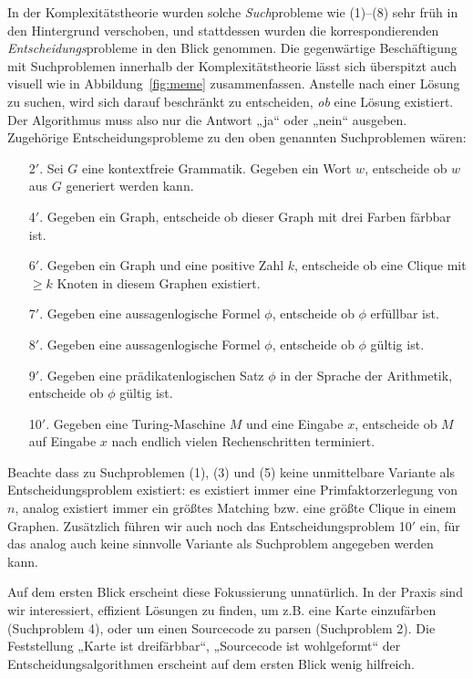 In der Komplexitätstheorie wurden solche \emph{Such}probleme wie (1)--(8) sehr früh in den Hintergrund verschoben, und stattdessen wurden die korrespondierenden \emph{Entscheidungs}probleme in den Blick genommen. Die gegenwärtige Beschäftigung mit Suchproblemen innerhalb der Komplexitätstheorie lässt sich überspitzt auch visuell wie in Abbildung~\ref{fig:meme} zusammenfassen. Anstelle nach einer Lösung zu suchen, wird sich darauf beschränkt zu entscheiden, \emph{ob} eine Lösung existiert. Der Algorithmus muss also nur die Antwort „ja“ oder „nein“ ausgeben. Zugehörige Entscheidungsprobleme zu den oben genannten Suchproblemen wären:
\begin{enumerate}
    \item[2$'$.] Sei $G$ eine kontextfreie Grammatik. Gegeben ein Wort $w$, entscheide ob $w$ aus $G$ generiert werden kann.
    \item[4$'$.] Gegeben ein Graph, entscheide ob dieser Graph mit drei Farben färbbar ist.
    \item[6$'$.] Gegeben ein Graph und eine positive Zahl $k$, entscheide ob eine Clique mit $\geq k$ Knoten in diesem Graphen existiert.
    \item[7$'$.] Gegeben eine aussagenlogische Formel $\phi$, entscheide ob $\phi$ erfüllbar ist.
    \item[8$'$.] Gegeben eine aussagenlogische Formel $\phi$, entscheide ob $\phi$ gültig ist.
    \item[9$'$.] Gegeben eine prädikatenlogischen Satz $\phi$ in der Sprache der Arithmetik, entscheide ob $\phi$ gültig ist.
    \item[10$'$.] Gegeben eine Turing-Maschine $M$ und eine Eingabe $x$, entscheide ob $M$ auf Eingabe $x$ nach endlich vielen Rechenschritten terminiert.
\end{enumerate}
Beachte dass zu Suchproblemen (1), (3) und (5) keine unmittelbare Variante als Entscheidungsproblem existiert: es existiert immer eine Primfaktorzerlegung von $n$, analog existiert immer ein größtes Matching bzw. eine größte Clique in einem Graphen.
Zusätzlich führen wir auch noch das Entscheidungsproblem 10$'$ ein, für das analog auch keine sinnvolle Variante als Suchproblem angegeben werden kann.

Auf dem ersten Blick erscheint diese Fokussierung unnatürlich. In der Praxis sind wir interessiert, effizient Lösungen zu finden, um z.B. eine Karte einzufärben (Suchproblem 4), oder um einen Sourcecode zu parsen (Suchproblem 2). Die Feststellung „Karte ist dreifärbbar“, „Sourcecode ist wohlgeformt“ der Entscheidungsalgorithmen erscheint auf dem ersten Blick wenig hilfreich.

